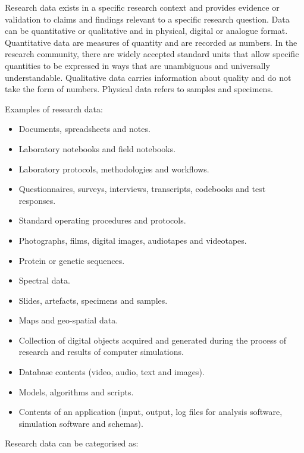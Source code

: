 \documentclass[
]{book}
\providecommand{\tightlist}{%
  \setlength{\itemsep}{0pt}\setlength{\parskip}{0pt}}
\begin{document}
Research data exists in a specific research context and provides evidence or validation to claims and findings relevant to a specific research question. Data can be quantitative or qualitative and in physical, digital or analogue format. Quantitative data are measures of quantity and are recorded as numbers. In the research community, there are widely accepted standard units that allow specific quantities to be expressed in ways that are unambiguous and universally understandable. Qualitative data carries information about quality and do not take the form of numbers. Physical data refers to samples and specimens.

Examples of research data:

\begin{itemize}
\tightlist
\item
  Documents, spreadsheets and notes.
\item
  Laboratory notebooks and field notebooks.
\item
  Laboratory protocols, methodologies and workflows.
\item
  Questionnaires, surveys, interviews, transcripts, codebooks and test responses.
\item
  Standard operating procedures and protocols.
\item
  Photographs, films, digital images, audiotapes and videotapes.
\item
  Protein or genetic sequences.
\item
  Spectral data.
\item
  Slides, artefacts, specimens and samples.
\item
  Maps and geo-spatial data.
\item
  Collection of digital objects acquired and generated during the process of research and results of computer simulations.
\item
  Database contents (video, audio, text and images).
\item
  Models, algorithms and scripts.
\item
  Contents of an application (input, output, log files for analysis software, simulation software and schemas).
\end{itemize}

Research data can be categorised as:
\end{document}
